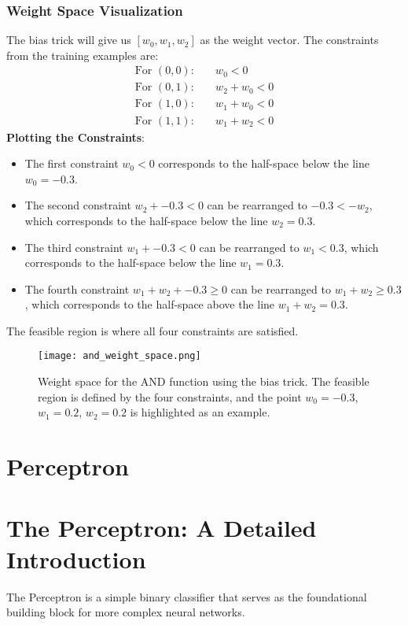 \subsubsection{Weight Space Visualization}  
The bias trick will give us \([w_{0}, w_{1}, w_{2}]\) as the weight vector. The constraints from the training examples are:
\begin{align}
\text{For }(0,0): & \quad w_{0} < 0 \\
\text{For }(0,1): & \quad w_{2} + w_{0} < 0 \\
\text{For }(1,0): & \quad w_{1} + w_{0} < 0 \\
\text{For }(1,1): & \quad w_{1} + w_{2} < 0             
\end{align}
\textbf{Plotting the Constraints}:
\begin{itemize}
    \item The first constraint \(w_{0} < 0\) corresponds to the half-space below the line \(w_{0} = -0.3\).
    \item The second constraint \(w_{2} + -0.3< 0\) can be rearranged to \(-0.3 < - w_{2}\), which corresponds to the half-space below the line \(w_{2} = 0.3 \).
    \item The third constraint \(w_{1} + -0.3 < 0\) can be rearranged to \(w_{1} < 0.3\), which corresponds to the half-space below the line \(w_{1} = 0.3\).
    \item The fourth constraint \(w_{1} + w_{2} + -0.3 \geq 0\) can be rearranged to \(w_{1} + w_{2} \geq 0.3\), which corresponds to the half-space above the line \(w_{1} + w_{2} = 0.3\).
\end{itemize}
The feasible region is where all four constraints are satisfied.
\begin{figure}[htbp]
    \centering
    \texttt{[image: and\_weight\_space.png]}
    \caption{Weight space for the AND function using the bias trick. The feasible region is defined by the four constraints, and the point \(w_0 = -0.3\), \(w_1 = 0.2\), \(w_2 = 0.2\) is highlighted as an example.}
    \label{fig:and_weight_space}
\end{figure}

\section{Perceptron}

\section{The Perceptron: A Detailed Introduction}
The Perceptron is a simple binary classifier that serves as the foundational building block for more complex neural networks.

